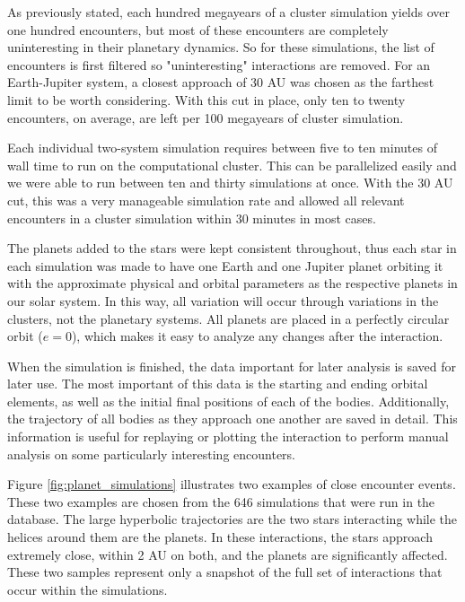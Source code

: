\documentclass[12pt]{article}
\begin{document}
    As previously stated, each hundred megayears of a cluster simulation yields over
    one hundred encounters, but most of these encounters are completely uninteresting
    in their planetary dynamics. So for these simulations, the list of encounters is 
    first filtered so "uninteresting" interactions are removed. For an Earth-Jupiter
    system, a closest approach of 30 AU was chosen as the farthest limit to be
    worth considering. With this cut in place, only ten to twenty encounters, on
    average, are left per 100 megayears of cluster simulation.


    Each individual two-system simulation requires between five to ten 
    minutes of wall time to run on the computational cluster. This can be
    parallelized easily and we were able to run between ten and thirty 
    simulations at once. With the 30 AU cut, this was a very manageable 
    simulation rate and allowed all relevant encounters in a cluster simulation
    within 30 minutes in most cases.

    The planets added to the stars were kept consistent throughout, thus 
    each star in each simulation was made to have one Earth and one Jupiter planet
    orbiting it with the approximate physical and orbital
    parameters as the respective planets in our solar system. 
    In this way, all variation will occur through variations in the clusters, not
    the planetary systems.
    All planets are
    placed in a perfectly circular orbit ($e=0$), which makes it easy to analyze
    any changes after the interaction.

    When the simulation is finished, the data important for later analysis is
    saved for later use. The most important of this data is the starting and ending
    orbital elements, as well as the initial final positions of each of the bodies.
    Additionally, the trajectory of all bodies as they approach one another are
    saved in detail. This information is useful for replaying or plotting the
    interaction to perform manual analysis on some particularly interesting 
    encounters.

    Figure \ref{fig:planet_simulations} illustrates two examples of close encounter
    events. These two examples are chosen from the 646 simulations
    that were run in the database. The large hyperbolic trajectories are the 
    two stars interacting while the helices around them are the planets. In these
    interactions, the stars approach extremely close, within 2 AU on both, and
    the planets are significantly affected. These two samples represent only
    a snapshot of the full set of interactions that occur within the simulations.
\end{document}
